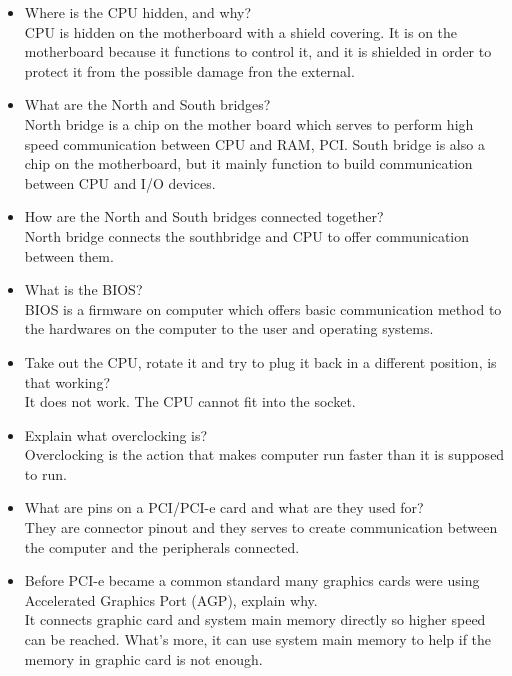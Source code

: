 \documentclass{article}
\begin{document}
\begin{itemize}
\item Where is the CPU hidden, and why?\\
CPU is hidden on the motherboard with a shield covering. It is on the motherboard because it functions to control it, and it is shielded in order to protect it from the possible damage fron the external.
\item What are the North and South bridges?\\
North bridge is a chip on the mother board which serves to perform high speed communication between CPU and RAM, PCI. South bridge is also a chip on the motherboard, but it mainly function to build communication between CPU and I/O devices.
\item How are the North and South bridges connected together?\\
North bridge connects the southbridge and CPU to offer communication between them.
\item What is the BIOS?\\
BIOS is a firmware on computer which offers basic communication method to the hardwares on the computer to the user and operating systems.
\item Take out the CPU, rotate it and try to plug it back in a different position, is that working?\\
It does not work. The CPU cannot fit into the socket.
\item Explain what overclocking is?\\
Overclocking is the action that makes computer run faster than it is supposed to run.
\item What are pins on a PCI/PCI-e card and what are they used for?\\
They are connector pinout and they serves to create communication between the computer and the peripherals connected.
\item Before PCI-e became a common standard many graphics cards were using Accelerated Graphics Port (AGP), explain why. \\
It connects graphic card and system main memory directly so higher speed can be reached. What's more, it can use system main memory to help if the memory in graphic card is not enough.
\end{itemize}
\end{document}
